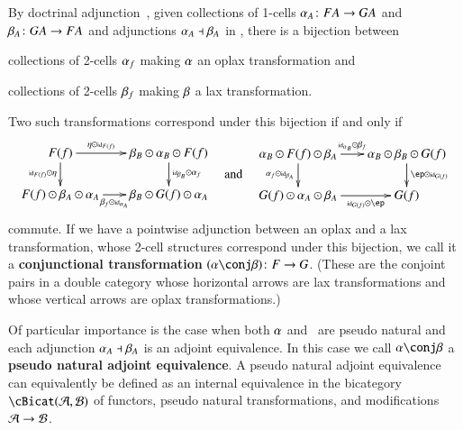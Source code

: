 By doctrinal adjunction~\cite{kelly:doc-adjn}, given collections of
1-cells $\alpha_A\colon FA\to GA$ and $\beta_A\colon GA\to FA$ and
adjunctions $\alpha_A\dashv \beta_A$ in \cB, there is a bijection between
\begin{inparaenum}
\item collections of 2-cells $\alpha_f$ making $\alpha$ an oplax
  transformation and
\item collections of 2-cells $\beta_f$ making $\beta$ a lax
  transformation.
\end{inparaenum}
Two such transformations correspond under this bijection if and only if
\begin{equation}
  \vcenter{\xymatrix@-.5pc{F(f) \ar[r]^-{\eta \odot \mbox{\tiny id}_{F(f)}}
      \ar[d]_{\mbox{\tiny id}_{F(f)}\odot \eta} &
      \be_B\odot \al_B \odot F(f) \ar[d]^{\mbox{\tiny id}_{\be_B} \odot \al_f}\\
      F(f) \odot \be_A\odot \al_A\ar[r]_-{\be_f \odot \mbox{\tiny id}_{\al_A}} &
      \be_B\odot G(f) \odot \al_A}}
  \quad\text{and}\quad
  \vcenter{\xymatrix@-.5pc{\al_B\odot F(f)\odot \be_A
      \ar[r]^-{\mbox{\tiny id}_{\al_B}\odot \be_f}\ar[d]_{\al_f \odot \mbox{\tiny id}_{\be_A}}&
      \al_B \odot \be_B \odot G(f)\ar[d]^{\ep \odot \mbox{\tiny id}_{G(f)}}\\
      G(f)\odot \al_A\odot \be_A \ar[r]_-{\mbox{\tiny id}_{G(f)} \odot \ep} & G(f)}}\label{eq:conjtrans}
\end{equation}
commute.  If we have a pointwise adjunction between an oplax and a lax
transformation, whose 2-cell structures correspond under this
bijection, we call it a \textbf{conjunctional transformation}
$(\al\conj \be)\maps F\to G$.  (These are the conjoint pairs in a
double category whose horizontal arrows are lax transformations and
whose vertical arrows are oplax transformations.)

Of particular importance is the case when both $\alpha$ and \be\ are
pseudo natural and each adjunction $\alpha_A\dashv \beta_A$ is an adjoint
equivalence.  In this case we call $\al\conj \be$ a \textbf{pseudo
  natural adjoint equivalence}.  A pseudo natural adjoint equivalence
can equivalently be defined as an internal equivalence in the
bicategory $\cBicat(\cA,\cB)$ of functors, pseudo natural
transformations, and modifications $\mathcal{A}\to\mathcal{B}$. 

